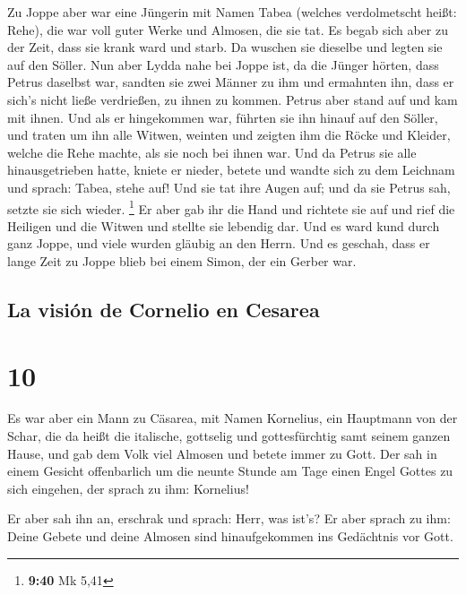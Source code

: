  Zu Joppe aber war eine Jüngerin mit Namen Tabea (welches
verdolmetscht heißt: Rehe), die war voll guter Werke und Almosen, die
sie tat.  Es begab sich aber zu der Zeit, dass sie krank
ward und starb. Da wuschen sie dieselbe und legten sie auf den Söller.
 Nun aber Lydda nahe bei Joppe ist, da die Jünger hörten,
dass Petrus daselbst war, sandten sie zwei Männer zu ihm und ermahnten
ihn, dass er sich's nicht ließe verdrießen, zu ihnen zu kommen.
 Petrus aber stand auf und kam mit ihnen. Und als er
hingekommen war, führten sie ihn hinauf auf den Söller, und traten um
ihn alle Witwen, weinten und zeigten ihm die Röcke und Kleider, welche
die Rehe machte, als sie noch bei ihnen war.  Und da
Petrus sie alle hinausgetrieben hatte, kniete er nieder, betete und
wandte sich zu dem Leichnam und sprach: Tabea, stehe auf! Und sie tat
ihre Augen auf; und da sie Petrus sah, setzte sie sich wieder.
\footnote{\textbf{9:40} Mk 5,41}  Er aber gab ihr die
Hand und richtete sie auf und rief die Heiligen und die Witwen und
stellte sie lebendig dar.  Und es ward kund durch ganz
Joppe, und viele wurden gläubig an den Herrn.  Und es
geschah, dass er lange Zeit zu Joppe blieb bei einem Simon, der ein
Gerber war.

\hypertarget{la-visiuxf3n-de-cornelio-en-cesarea}{%
\subsection{La visión de Cornelio en
Cesarea}\label{la-visiuxf3n-de-cornelio-en-cesarea}}

\hypertarget{section-9}{%
\section{10}\label{section-9}}

 Es war aber ein Mann zu Cäsarea, mit Namen Kornelius, ein
Hauptmann von der Schar, die da heißt die italische, 
gottselig und gottesfürchtig samt seinem ganzen Hause, und gab dem Volk
viel Almosen und betete immer zu Gott.  Der sah in einem
Gesicht offenbarlich um die neunte Stunde am Tage einen Engel Gottes zu
sich eingehen, der sprach zu ihm: Kornelius!

 Er aber sah ihn an, erschrak und sprach: Herr, was ist's?
Er aber sprach zu ihm: Deine Gebete und deine Almosen sind
hinaufgekommen ins Gedächtnis vor Gott.

